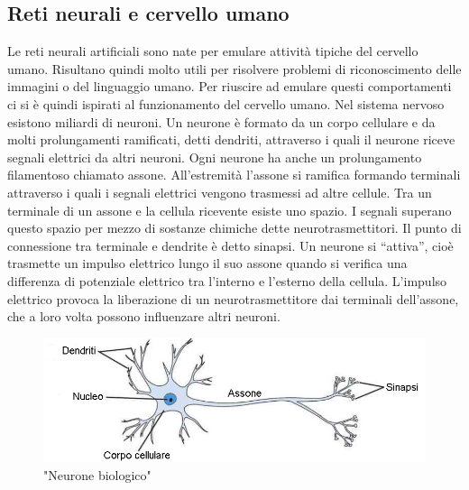 \documentclass[a4paper,11pt]{article}
\begin{document}
    \subsection {Reti neurali e cervello umano}
    Le reti neurali artificiali sono nate per emulare attività tipiche del
    cervello umano. Risultano quindi molto utili per risolvere problemi di riconoscimento delle immagini o del linguaggio umano.
    Per riuscire ad emulare questi comportamenti ci si è quindi ispirati al funzionamento del cervello umano.
    Nel sistema nervoso esistono miliardi di neuroni. Un
    neurone è formato da un corpo cellulare e da molti prolungamenti
    ramificati, detti dendriti, attraverso i quali il neurone riceve segnali
    elettrici da altri neuroni. Ogni neurone ha anche un prolungamento
    filamentoso chiamato assone. All’estremità l’assone si ramifica formando terminali
    attraverso i quali i segnali elettrici vengono trasmessi ad altre cellule.
    Tra un terminale di un assone e la cellula ricevente esiste uno spazio. I segnali superano questo spazio per
    mezzo di sostanze chimiche dette neurotrasmettitori. Il punto di
    connessione tra terminale e dendrite è detto sinapsi. 
    Un neurone si “attiva”, cioè trasmette un impulso elettrico lungo il suo
    assone quando si verifica una differenza di potenziale elettrico tra l’interno
    e l’esterno della cellula. L’impulso elettrico provoca la liberazione di un
    neurotrasmettitore dai terminali dell’assone, che a loro volta possono influenzare altri neuroni. 
        
    \begin{figure}[h]
        \centering
        \includegraphics[scale=0.7]{cervello.jpg}
        \caption{"Neurone biologico"}
    \end{figure}
\end{document}
